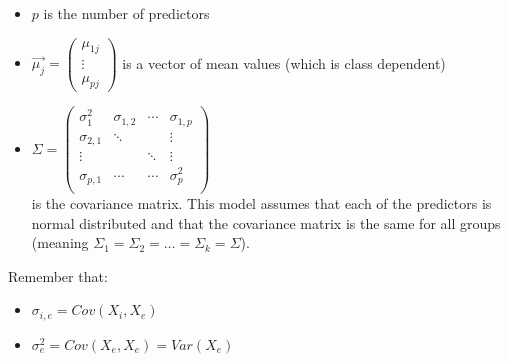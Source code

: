       \begin{itemize}
        \item $p$ is the number of predictors
        \item $\vec{\mu_j} =
        \begin{pmatrix}\mu_{1j}\\\vdots\\\mu_{pj}\end{pmatrix}$ is a vector of
        mean values (which is class dependent)
        \item $\Sigma = 
          \begin{pmatrix}
            \sigma^2_1   & \sigma_{1,2} & \cdots & \sigma_{1,p}\\
            \sigma_{2,1} & \ddots       &        & \vdots      \\
            \vdots       &              & \ddots & \vdots      \\
            \sigma_{p,1} & \cdots       & \cdots & \sigma_p^{2}\\
          \end{pmatrix}$\\ 
          is the covariance matrix. This model assumes that each of the
          predictors is normal distributed and that the covariance matrix is the
          same for all groups (meaning
          $\Sigma_1=\Sigma_2=\dots=\Sigma_k=\Sigma$). \end{itemize}
          \vspace{\baselineskip}

      Remember that:
      \begin{itemize}
        \item $\sigma_{i,e}=Cov(X_i,X_e)$
        \item $\sigma_{e}^2=Cov(X_e,X_e)=Var(X_e)$
      \end{itemize}
      
